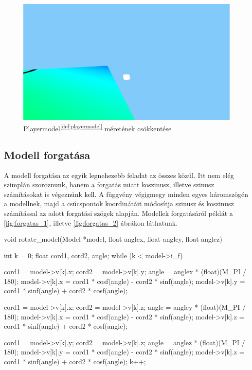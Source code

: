 	
	
\begin{figure}[h]
		\centering
		\includegraphics[width=13truecm, height=7truecm]{images/modell_4.3.1.3.png}
		\caption{Playermodel\textsuperscript{\ref{def:playermodel}} méretének csökkentése}
		\label{fig:meret_2}
\end{figure}

	



\newpage
\subsection{Modell forgatása}
A modell forgatása az egyik legnehezebb feladat az összes közül. Itt nem elég szimplán szoroznunk, hanem a forgatás miatt koszinusz, illetve szinusz számításokat is végeznünk kell. A függvény végigmegy minden egyes háromszögén a modellnek, majd a csúcspontok koordinátáit módosítja szinusz és koszinusz számítással az adott forgatási szögek alapján. Modellek forgatásáról példát a \ref{fig:forgatas_1}, illetve \ref{fig:forgatas_2} ábrákon láthatunk.
\begin{cpp}
void rotate_model(Model *model, float anglex, float angley, float anglez)
{
    int k = 0;
    float cord1, cord2, angle;
    while (k < model->i_f)
    {
        cord1 = model->v[k].x;
        cord2 = model->v[k].y;
        angle = anglex * (float)(M_PI / 180);
        model->v[k].x = cord1 * cosf(angle) - cord2 * sinf(angle);
        model->v[k].y = cord1 * sinf(angle) + cord2 * cosf(angle);
			
        cord1 = model->v[k].x;
        cord2 = model->v[k].z;
        angle = angley * (float)(M_PI / 180);
        model->v[k].x = cord1 * cosf(angle) - cord2 * sinf(angle);
        model->v[k].z = cord1 * sinf(angle) + cord2 * cosf(angle);
			
        cord1 = model->v[k].y;
        cord2 = model->v[k].z;
        angle = anglez * (float)(M_PI / 180);
        model->v[k].y = cord1 * cosf(angle) - cord2 * sinf(angle);
        model->v[k].z = cord1 * sinf(angle) + cord2 * cosf(angle);
        k++;
    }
}
\end{cpp}



